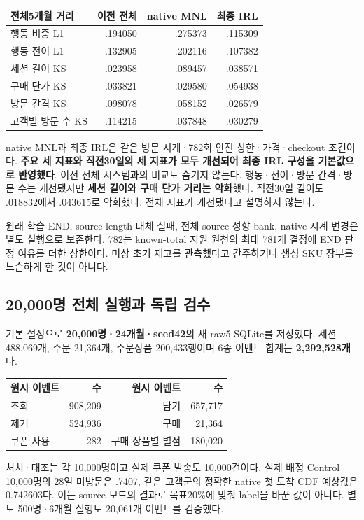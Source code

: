 \documentclass[11pt,a4paper]{article}
\newcommand{\thead}{\rowcolor{pale}}
\begin{document}
\begin{tabularx}{\linewidth}{@{}Yrrr@{}}
\thead 전체5개월 거리 & 이전 전체 & native MNL & 최종 IRL\\\midrule
행동 비중 L1 & .194050 & .275373 & .115309\\
행동 전이 L1 & .132905 & .202116 & .107382\\
세션 길이 KS & .023958 & .089457 & .038571\\
구매 단가 KS & .033821 & .029580 & .054938\\
방문 간격 KS & .098078 & .058152 & .026579\\
고객별 방문 수 KS & .114215 & .037848 & .030279\\\bottomrule
\end{tabularx}

native MNL과 최종 IRL은 같은 방문 시계·782회 안전 상한·가격·checkout 조건이다. \textbf{주요 세 지표와 직전30일의 세 지표가 모두 개선되어 최종 IRL 구성을 기본값으로 반영했다}. 이전 전체 시스템과의 비교도 숨기지 않는다. 행동·전이·방문 간격·방문 수는 개선됐지만 \textbf{세션 길이와 구매 단가 거리는 악화}했다. 직전30일 길이도 .018832에서 .043615로 악화했다. 전체 지표가 개선됐다고 설명하지 않는다.

원래 학습 END, source-length 대체 실패, 전체 source 성향 bank, native 시계 변경은 별도 실행으로 보존한다. 782는 known-total 지원 원천의 최대 781개 결정에 END 판정 여유를 더한 상한이다. 미상 초기 재고를 관측했다고 간주하거나 생성 SKU 장부를 느슨하게 한 것이 아니다.

\subsection{20,000명 전체 실행과 독립 검수}
기본 설정으로 \textbf{20,000명·24개월·seed42}의 새 raw5 SQLite를 저장했다. 세션 488,069개, 주문 21,364개, 주문상품 200,433행이며 6종 이벤트 합계는 \textbf{2,292,528개}다.

\begin{tabularx}{\linewidth}{@{}Yrrr@{}}
\thead 원시 이벤트 & 수 & 원시 이벤트 & 수\\\midrule
조회 & 908,209 & 담기 & 657,717\\
제거 & 524,936 & 구매 & 21,364\\
쿠폰 사용 & 282 & 구매 상품별 별점 & 180,020\\\bottomrule
\end{tabularx}

처치·대조는 각 10,000명이고 실제 쿠폰 발송도 10,000건이다. 실제 배정 Control 10,000명의 28일 미방문은 .7407, 같은 고객군의 정확한 native 첫 도착 CDF 예상값은 0.742603다. 이는 source 모드의 결과로 목표20\%에 맞춰 label을 바꾼 값이 아니다. 별도 500명·6개월 실행도 20,061개 이벤트를 검증했다.
\end{document}
